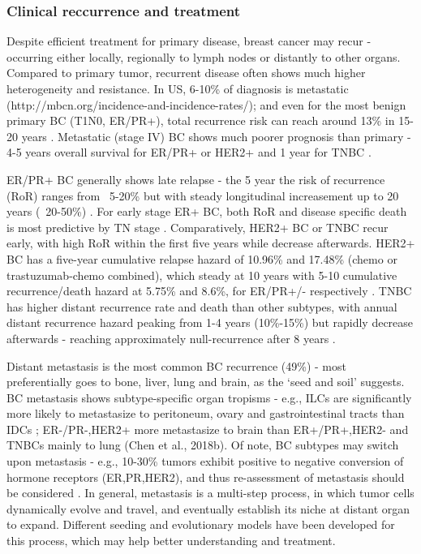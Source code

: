 \subsubsection{Clinical reccurrence and treatment}

Despite efficient treatment for primary disease, breast cancer may recur - occurring either locally, regionally to lymph nodes or distantly to other organs. Compared to primary tumor, recurrent disease often shows much higher heterogeneity and resistance. In US, 6-10\% of diagnosis is metastatic (http://mbcn.org/incidence-and-incidence-rates/); and even for the most benign primary BC (T1N0, ER/PR+), total recurrence risk can reach around 13\% in 15-20 years \citep{pan201720}. Metastatic (stage IV) BC shows much poorer prognosis than primary - 4-5 years overall survival for ER/PR+ or HER2+ and 1 year for TNBC \citep{bardia2017efficacy,ellis2015fulvestrant,swain2015pertuzumab}.

ER/PR+ BC generally shows late relapse - the 5 year the risk of recurrence (RoR) ranges from ~5-20\% but with steady longitudinal increasement up to 20 years (~20-50\%) . For early stage ER+ BC, both RoR and disease specific death is most predictive by TN stage \citep{pan201720}. Comparatively, HER2+ BC or TNBC recur early, with high RoR within the first five years while decrease afterwards. HER2+ BC has a five-year cumulative relapse hazard of 10.96\% and 17.48\% (chemo or trastuzumab-chemo combined), which steady at 10 years with 5-10 cumulative recurrence/death hazard at 5.75\% and 8.6\%, for ER/PR+/- respectively \citep{chumsri2019incidence}. TNBC has higher distant recurrence rate and death than other subtypes, with annual distant recurrence hazard peaking from 1-4 years (10\%-15\%) but rapidly decrease afterwards - reaching approximately null-recurrence after 8 years \citep{dent2007triple}. 

Distant metastasis is the most common BC recurrence (49\%) \citep{bruce1970patterns}- most preferentially goes to bone, liver, lung and brain, as the ‘seed and soil’ suggests. BC metastasis shows subtype-specific organ tropisms - e.g., ILCs are significantly more likely to metastasize to peritoneum, ovary and gastrointestinal tracts than IDCs \citep{mathew2017distinct}; ER-/PR-,HER2+ more metastasize to brain than ER+/PR+,HER2- and TNBCs mainly to lung (Chen et al., 2018b). Of note, BC subtypes may switch upon metastasis - e.g., 10-30\% tumors exhibit positive to negative conversion of hormone receptors (ER,PR,HER2), and thus re-assessment of metastasis should be considered \citep{schrijver2018receptor}. In general, metastasis is a multi-step process, in which tumor cells dynamically evolve and travel, and eventually establish its niche at distant organ to expand. Different seeding and evolutionary models have been developed for this process, which may help better understanding and treatment. 


